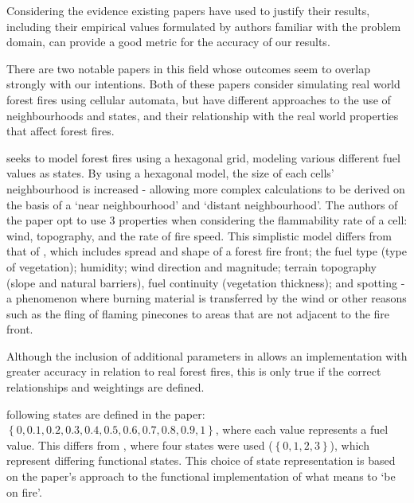 \documentclass[11pt, a4paper, titlepage]{article}
\begin{document}
Considering the evidence existing papers have used to justify their results, including their empirical values formulated by authors familiar with the problem domain, can provide a good metric for the accuracy of our results. 


There are two notable papers in this field whose outcomes seem to overlap strongly with our intentions. Both of these papers consider simulating real world forest fires using cellular automata, but have different approaches to the use of neighbourhoods and states, and their relationship with the real world properties that affect forest fires.


\cite{HERNANDEZENCINAS20071213} seeks to model forest fires using a hexagonal grid, modeling various different fuel values as states. By using a hexagonal model, the size of each cells' neighbourhood is increased - allowing more complex calculations to be derived on the basis of a `near neighbourhood' and `distant neighbourhood'.
The authors of the paper opt to use 3 properties when considering the flammability rate of a cell: wind, topography, and the rate of fire speed. This simplistic model differs from that of \cite{ALEXANDRIDIS2008191}, which includes 
spread and shape of a forest fire front; the fuel type (type of vegetation); humidity; wind direction and magnitude; terrain topography (slope and natural barriers), fuel continuity (vegetation thickness); and spotting - a phenomenon where burning material is transferred by the wind or other reasons such as the fling of flaming pinecones to areas that are not adjacent to the fire front.

Although the inclusion of additional parameters in \cite{ALEXANDRIDIS2008191} allows an implementation with greater accuracy in relation to real forest fires, this is only true if the correct relationships and weightings are defined.


  \cite{HERNANDEZENCINAS20071213} following states are defined in the paper: \\ $\left\{ 0, 0.1, 0.2, 0.3, 0.4, 0.5, 0.6, 0.7, 0.8, 0.9, 1  \right\}$, where each value represents a fuel value. This differs from \cite{ALEXANDRIDIS2008191}, where four states were used ($ \left\{ 0, 1, 2,3 \right\}$), which represent differing functional states. This choice of state representation is based on the paper's approach to the functional implementation of what means to `be on fire'.
\end{document}
